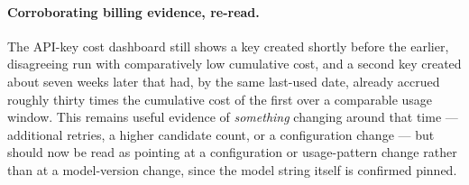 \documentclass[11pt]{article}
\begin{document}
\paragraph{Corroborating billing evidence, re-read.} The API-key cost
dashboard still shows a key created shortly before the earlier, disagreeing
run with comparatively low cumulative cost, and a second key created about
seven weeks later that had, by the same last-used date, already accrued
roughly thirty times the cumulative cost of the first over a comparable
usage window. This remains useful evidence of \emph{something} changing
around that time --- additional retries, a higher candidate count, or a
configuration change --- but should now be read as pointing at a
configuration or usage-pattern change rather than at a model-version
change, since the model string itself is confirmed pinned.
\end{document}
